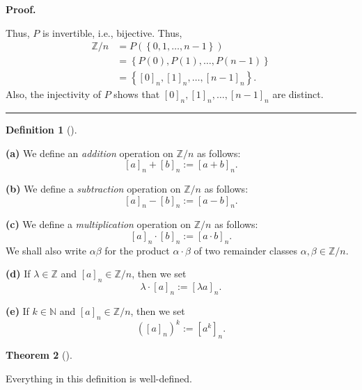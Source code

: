 \documentclass[numbers=enddot,12pt,final,onecolumn,notitlepage]{scrartcl}%
\numberwithin{exer}{subsection}
\theoremstyle{definition}
\newtheorem{theo}{Theorem}[subsection]
\newenvironment{theorem}[1][]
{\begin{theo}[#1]\begin{leftbar}}
{\end{leftbar}\end{theo}}
\newtheorem{defi}[theo]{Definition}
\newenvironment{definition}[1][]
{\begin{defi}[#1]\begin{leftbar}}
{\end{leftbar}\end{defi}}
\newenvironment{proof}[1][Proof]{\noindent\textbf{#1.} }{\ \rule{0.5em}{0.5em}}
\begin{document}
\begin{proof}
\begin{itemize}
\end{itemize}

Thus, $P$ is invertible, i.e., bijective. Thus,%
\begin{align*}
\mathbb{Z}/n  &  =P\left(  \left\{  0,1,\ldots,n-1\right\}  \right) \\
&  =\left\{  P\left(  0\right)  ,P\left(  1\right)  ,\ldots,P\left(
n-1\right)  \right\} \\
&  =\left\{  \left[  0\right]  _{n},\left[  1\right]  _{n},\ldots,\left[
n-1\right]  _{n}\right\}  .
\end{align*}
Also, the injectivity of $P$ shows that $\left[  0\right]  _{n},\left[
1\right]  _{n},\ldots,\left[  n-1\right]  _{n}$ are distinct.
\end{proof}

\begin{definition}
\textbf{(a)} We define an \textit{addition} operation on $\mathbb{Z}/n$ as
follows:%
\[
\left[  a\right]  _{n}+\left[  b\right]  _{n}:=\left[  a+b\right]  _{n}.
\]


\textbf{(b)} We define a \textit{subtraction}\textbf{ }operation on
$\mathbb{Z}/n$ as follows:%
\[
\left[  a\right]  _{n}-\left[  b\right]  _{n}:=\left[  a-b\right]  _{n}.
\]


\textbf{(c)} We define a \textit{multiplication} operation on $\mathbb{Z}/n$
as follows:%
\[
\left[  a\right]  _{n}\cdot\left[  b\right]  _{n}:=\left[  a\cdot b\right]
_{n}.
\]
We shall also write $\alpha\beta$ for the product $\alpha\cdot\beta$ of two
remainder classes $\alpha,\beta\in\mathbb{Z}/n$.

\textbf{(d)} If $\lambda\in\mathbb{Z}$ and $\left[  a\right]  _{n}%
\in\mathbb{Z}/n$, then we set
\[
\lambda\cdot\left[  a\right]  _{n}:=\left[  \lambda a\right]  _{n}.
\]


\textbf{(e)} If $k\in\mathbb{N}$ and $\left[  a\right]  _{n}\in\mathbb{Z}/n$,
then we set
\[
\left(  \left[  a\right]  _{n}\right)  ^{k}:=\left[  a^{k}\right]  _{n}.
\]

\end{definition}

\begin{theorem}
Everything in this definition is well-defined.
\end{theorem}
\end{document}
